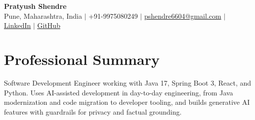 \documentclass[a4paper,11pt]{article}
\begin{document}
\begin{center}
  {\Large\bfseries Pratyush Shendre}\\[2pt]
  \small Pune, Maharashtra, India $|$ +91-9975080249 $|$
  \href{mailto:pshendre6604@gmail.com}{pshendre6604@gmail.com} $|$
  \href{https://www.linkedin.com/in/pratyush-shendre-2256a7223/}{\underline{LinkedIn}} $|$
  \href{https://github.com/PratyushS04}{\underline{GitHub}}
\end{center}

\section{Professional Summary}
\small Software Development Engineer working with Java 17, Spring Boot 3, React, and Python. Uses AI-assisted development in day-to-day engineering, from Java modernization and code migration to developer tooling, and builds generative AI features with guardrails for privacy and factual grounding.
\end{document}

